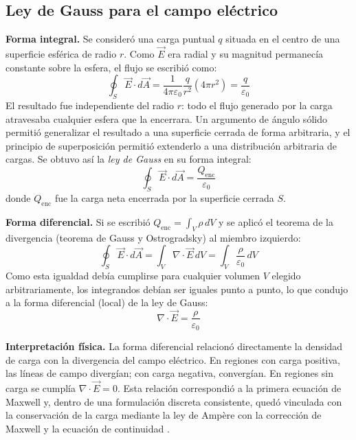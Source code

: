 \subsection{Ley de Gauss para el campo eléctrico}
\textbf{Forma integral.} Se consideró una carga puntual $q$ situada en el centro de una superficie esférica de radio $r$. Como $\vec{E}$ era radial y su magnitud permanecía constante sobre la esfera, el flujo se escribió como:
\begin{equation}
    \oint_S \vec{E} \cdot d\vec{A} = \frac{1}{4\pi\varepsilon_0} \frac{q}{r^2} (4\pi r^2) = \frac{q}{\varepsilon_0}
\end{equation}
El resultado fue independiente del radio $r$: todo el flujo generado por la carga atravesaba cualquier esfera que la encerrara. Un argumento de ángulo sólido permitió generalizar el resultado a una superficie cerrada de forma arbitraria, y el principio de superposición permitió extenderlo a una distribución arbitraria de cargas. Se obtuvo así la \textit{ley de Gauss} en su forma integral:
\begin{equation}
    \oint_S \vec{E} \cdot d\vec{A} = \frac{Q_{\text{enc}}}{\varepsilon_0}
\end{equation}
donde $Q_{\text{enc}}$ fue la carga neta encerrada por la superficie cerrada $S$.

\textbf{Forma diferencial.} Si se escribió $Q_{\text{enc}} = \int_V \rho \, dV$ y se aplicó el teorema de la divergencia (teorema de Gauss y Ostrogradsky) al miembro izquierdo:
\begin{equation}
    \oint_S \vec{E} \cdot d\vec{A} = \int_V \nabla \cdot \vec{E} \, dV = \int_V \frac{\rho}{\varepsilon_0} \, dV
\end{equation}
Como esta igualdad debía cumplirse para cualquier volumen $V$ elegido arbitrariamente, los integrandos debían ser iguales punto a punto, lo que condujo a la forma diferencial (local) de la ley de Gauss:
\begin{equation}
    \nabla \cdot \vec{E} = \frac{\rho}{\varepsilon_0}
\end{equation}

\textbf{Interpretación física.} La forma diferencial relacionó directamente la densidad de carga con la divergencia del campo eléctrico. En regiones con carga positiva, las líneas de campo divergían; con carga negativa, convergían. En regiones sin carga se cumplía $\nabla \cdot \vec{E}=0$. Esta relación correspondió a la primera ecuación de Maxwell y, dentro de una formulación discreta consistente, quedó vinculada con la conservación de la carga mediante la ley de Ampère con la corrección de Maxwell y la ecuación de continuidad \cite{Taflove2005}.

